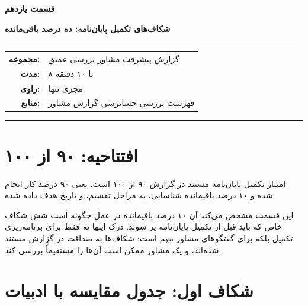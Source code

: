 \documentclass[12pt, a4paper]{article}
\newcommand{\dash}{\lr{---}}
\begin{document}

\thispagestyle{empty}

\vspace*{1.2cm}

{\centering
{\color{seriesblue}\fontsize{24}{30}\selectfont\bfseries قسمت يازدهم}

\vspace{0.5cm}
{\fontsize{15}{20}\selectfont\bfseries شکاف‌های تکميل پايان‌نامه: ده درصد باقی‌مانده}

\vspace{0.9cm}
{\color{seriesblue}\rule{0.55\linewidth}{1pt}}
\vspace{0.7cm}

{\normalsize
\begin{tabular}{rl}
  \textbf{مجموعه:}     & گزارش پيشرفت مشاور \dash{} بررسی عمیق \\[5pt]
  \textbf{مدت:}        & ۸ تا ۱۰ دقیقه \\[5pt]
  \textbf{راوی:}       & مجری تنها \\[5pt]
  \textbf{منابع:}      & فهرست بررسی حسابرسی گزارش مشاور \\
\end{tabular}
}

\vspace{0.9cm}
{\color{seriesblue}\rule{0.55\linewidth}{0.4pt}}
\par}

\vspace{1.2cm}

\section{افتتاحیه: ۹۰ از ۱۰۰}

امتياز تکميل پايان‌نامه مستند در گزارش ۹۰ از ۱۰۰ است. يعنی ۹۰ درصد کار انجام شده و ۱۰ درصد باقيمانده شناسايی، به مراحل تقسيم، و تاريخ هدف داده شده.

اين قسمت مشخص می‌کند آن ۱۰ درصد باقيمانده در عمل چگونه است \dash{} شش شکاف خاص که بايد قبل از تکميل پايان‌نامه پر شوند. درک اينها نه فقط برای برنامه‌ريزی تکميل بلکه برای گفتگوهای مشاور مهم است: شکاف‌ها به صداقت در گزارش مستند شده‌اند، و يک مشاور ممکن است آن‌ها را مستقيماً بررسی کند.

\section{شکاف اول: جدول مقايسه با ادبيات}
\end{document}
